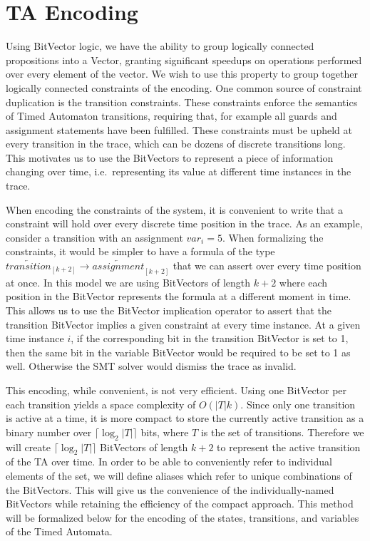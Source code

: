\documentclass[a4paper,12pt]{article}
\begin{document}
\section{TA Encoding}\label{encoding}

Using BitVector logic, we have the ability to group logically connected
propositions into a Vector, granting significant speedups on operations
performed over every element of the vector. We wish to use this property to
group together logically connected constraints of the encoding. One common
source of constraint duplication is the transition constraints. These
constraints enforce the semantics of Timed Automaton transitions, requiring
that, for example all guards and assignment statements have been fulfilled.
These constraints must be upheld at every transition in the trace, which can be
dozens of discrete transitions long. This motivates us to use the BitVectors to
represent a piece of information changing over time, i.e.\ representing its value
at different time instances in the trace.

When encoding the constraints of the system, it is convenient to write that a
constraint will hold over every discrete time position in the trace. As an
example, consider a transition with an assignment \(var_i = 5\). When
formalizing the constraints, it would be simpler to have a formula of the type
\(\overleftarrow{transition}_{[k+2]} \rightarrow
\overleftarrow{assignment}_{[k+2]}\) that we can assert over every time position
at once. In this model we are using BitVectors of length \(k+2\) where each
position in the BitVector represents the formula at a different moment in time.
This allows us to use the BitVector implication operator to assert that the
transition BitVector implies a given constraint at every time instance. At a
given time instance \(i\), if the corresponding bit in the transition BitVector
is set to 1, then the same bit in the variable BitVector would be required to be
set to 1 as well. Otherwise the SMT solver would dismiss the trace as invalid.

This encoding, while convenient, is not very efficient. Using one BitVector per
each transition yields a space complexity of \(O(|T|k)\). Since only one
transition is active at a time, it is more compact to store the currently active
transition as a binary number over \(\lceil\log_2 |T|\rceil\) bits, where \(T\)
is the set of transitions. Therefore we will create \(\lceil\log_2 |T|\rceil\)
BitVectors of length \(k+2\) to represent the active transition of the TA over
time. In order to be able to conveniently refer to individual elements of the
set, we will define aliases which refer to unique combinations of the
BitVectors. This will give us the convenience of the individually-named BitVectors
while retaining the efficiency of the compact approach. This method will be
formalized below for the encoding of the states, transitions, and variables of
the Timed Automata.
\end{document}
